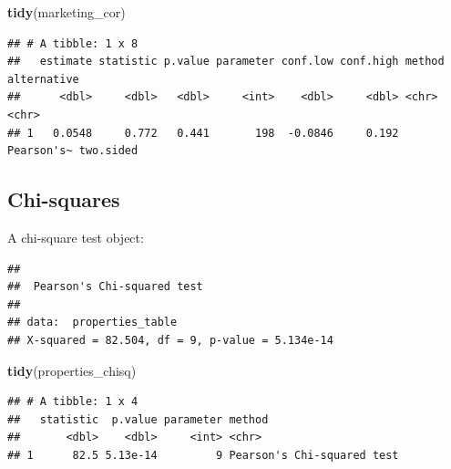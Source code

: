 \documentclass[
]{book}
\newenvironment{Shaded}{\begin{snugshade}}{\end{snugshade}}
\newcommand{\AttributeTok}[1]{\textcolor[rgb]{0.13,0.29,0.53}{#1}}
\newcommand{\ConstantTok}[1]{\textcolor[rgb]{0.56,0.35,0.01}{#1}}
\newcommand{\FunctionTok}[1]{\textcolor[rgb]{0.13,0.29,0.53}{\textbf{#1}}}
\newcommand{\NormalTok}[1]{#1}
\newcommand{\OtherTok}[1]{\textcolor[rgb]{0.56,0.35,0.01}{#1}}
\newcommand{\SpecialCharTok}[1]{\textcolor[rgb]{0.81,0.36,0.00}{\textbf{#1}}}
\newcommand{\StringTok}[1]{\textcolor[rgb]{0.31,0.60,0.02}{#1}}
\begin{document}
\begin{Shaded}
\begin{Highlighting}[]
\FunctionTok{tidy}\NormalTok{(marketing\_cor)}
\end{Highlighting}
\end{Shaded}

\begin{verbatim}
## # A tibble: 1 x 8
##   estimate statistic p.value parameter conf.low conf.high method     alternative
##      <dbl>     <dbl>   <dbl>     <int>    <dbl>     <dbl> <chr>      <chr>      
## 1   0.0548     0.772   0.441       198  -0.0846     0.192 Pearson's~ two.sided
\end{verbatim}

\subsection{Chi-squares}\label{chi-squares-1}

A chi-square test object:

\begin{Shaded}
\end{Shaded}

\begin{verbatim}
## 
##  Pearson's Chi-squared test
## 
## data:  properties_table
## X-squared = 82.504, df = 9, p-value = 5.134e-14
\end{verbatim}

\begin{Shaded}
\begin{Highlighting}[]
\FunctionTok{tidy}\NormalTok{(properties\_chisq)}
\end{Highlighting}
\end{Shaded}

\begin{verbatim}
## # A tibble: 1 x 4
##   statistic  p.value parameter method                    
##       <dbl>    <dbl>     <int> <chr>                     
## 1      82.5 5.13e-14         9 Pearson's Chi-squared test
\end{verbatim}
\end{document}
